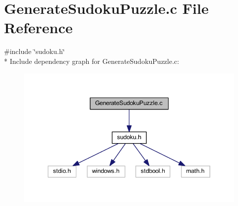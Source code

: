 \section{Generate\+Sudoku\+Puzzle.\+c File Reference}
\label{_generate_sudoku_puzzle_8c}
{\ttfamily \#include \char`\"{}sudoku.\+h\char`\"{}}\\*
Include dependency graph for Generate\+Sudoku\+Puzzle.\+c\+:
\nopagebreak
\begin{figure}[H]
\begin{center}
\leavevmode
\includegraphics[width=345pt]{_generate_sudoku_puzzle_8c__incl}
\end{center}
\end{figure}

